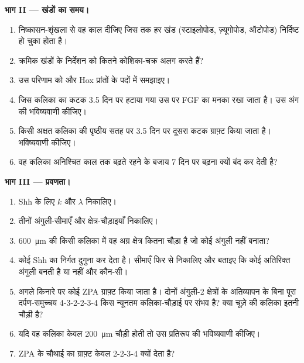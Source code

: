 \begin{problem}
\medskip
\noindent\textbf{भाग II --- खंडों का समय।}
\begin{enumerate}[resume]
  \item निष्कासन-शृंखला से वह काल दीजिए जिस तक हर खंड
        (स्टाइलोपोड, ज़्यूगोपोड, ऑटोपोड) निर्दिष्ट हो चुका होता है।
  \item क्रमिक खंडों के निर्देशन को कितने कोशिका-चक्र अलग
        करते हैं?
  \item उस परिणाम को  और
        Hox प्रांतों के पदों में समझाइए।
  \item जिस कलिका का कटक 3.5 दिन पर हटाया गया उस पर FGF का मनका
        रखा जाता है। उस अंग की भविष्यवाणी कीजिए।
  \item किसी अक्षत कलिका की पृष्ठीय सतह पर 3.5 दिन पर दूसरा कटक
        ग्राफ़्ट किया जाता है। भविष्यवाणी कीजिए।
  \item वह कलिका अनिश्चित काल तक बढ़ते रहने के बजाय 7 दिन पर बढ़ना क्यों
        बंद कर देती है?
\end{enumerate}

\medskip
\noindent\textbf{भाग III --- प्रवणता।}
\begin{enumerate}[resume]
  \item Shh के लिए $k$ और $\lambda$ निकालिए।
  \item तीनों अंगुली-सीमाएँ और क्षेत्र-चौड़ाइयाँ निकालिए।
  \item \qty{600}{\micro m} की किसी कलिका में वह अग्र क्षेत्र कितना
        चौड़ा है जो कोई अंगुली नहीं बनाता?
  \item कोई  Shh का निर्गत दुगुना कर देता है। सीमाएँ फिर से
        निकालिए और बताइए कि कोई अतिरिक्त अंगुली बनती है या नहीं और कौन-सी।
  \item अगले किनारे पर कोई ZPA ग्राफ़्ट किया जाता है। दोनों अंगुली-2
        क्षेत्रों के अतिव्यापन के बिना पूरा दर्पण-समुच्चय 4-3-2-2-3-4
        किस न्यूनतम कलिका-चौड़ाई पर संभव है? क्या चूज़े की कलिका इतनी
        चौड़ी है?
  \item यदि वह कलिका केवल \qty{200}{\micro m} चौड़ी होती तो उस
        प्रतिरूप की भविष्यवाणी कीजिए।
  \item ZPA के चौथाई का ग्राफ़्ट केवल 2-2-3-4 क्यों देता है?
\end{enumerate}


\end{problem}
